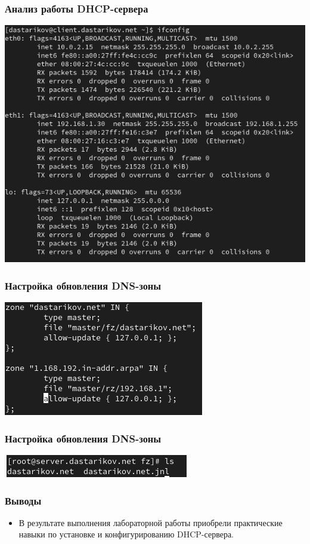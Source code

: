 \begin{frame}
\frametitle{Анализ работы DHCP-сервера}
    \centering
    \includegraphics[width=\textwidth]{../images/image11.png}
\end{frame}


\begin{frame}
\frametitle{Настройка обновления DNS-зоны}
    \centering
    \includegraphics[width=\textwidth]{../images/image12.png}
\end{frame}


\begin{frame}
\frametitle{Настройка обновления DNS-зоны}
    \centering
    \includegraphics[width=\textwidth]{../images/image14.png}
\end{frame}

\begin{frame}
\frametitle{Выводы}
\begin{itemize}
    \item В результате выполнения лабораторной работы приобрели практические навыки по установке и конфигурированию DHCP-сервера.
\end{itemize}
\end{frame}

